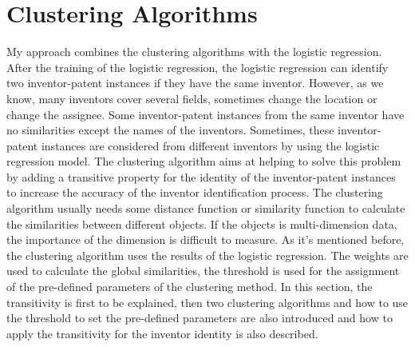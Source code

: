 \section{Clustering Algorithms}
My approach combines the clustering algorithms with the logistic regression. After the training of the logistic regression, the logistic regression can identify two inventor-patent instances if they have the same inventor. However, as we know, many inventors cover several fields, sometimes change the location or change the assignee. Some inventor-patent instances from the same inventor have no similarities except the names of the inventors. Sometimes, these inventor-patent instances are considered from different inventors by using the logistic regression model. The clustering algorithm aims at helping to solve this problem by adding a transitive property for the identity of the inventor-patent instances to increase the accuracy of the inventor identification process. The clustering algorithm usually needs some distance function or similarity function to calculate the similarities between different objects. If the objects is multi-dimension data, the importance of the dimension is difficult to measure. As it's mentioned before, the clustering algorithm uses the results of the logistic regression. The weights are used to calculate the global similarities, the threshold is used for the assignment of the pre-defined parameters of the clustering method. In this section, the transitivity is first to be explained, then two clustering algorithms and how to use the threshold to set the pre-defined parameters are also introduced and how to apply the transitivity for the inventor identity is also described.

